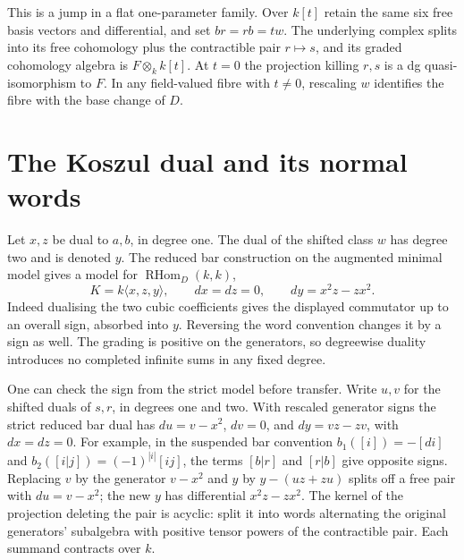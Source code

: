 \documentclass[11pt]{article}
\newcommand{\RHom}{\operatorname{RHom}}
\begin{document}
This is a jump in a flat one-parameter family. Over $k[t]$ retain the
same six free basis vectors and differential, and set $br=rb=t w$.
The underlying complex splits into its free cohomology plus the
contractible pair $r\mapsto s$, and its graded cohomology algebra is
$F\otimes_k k[t]$. At $t=0$ the projection killing $r,s$ is a dg
quasi-isomorphism to $F$. In any field-valued fibre with $t\ne0$,
rescaling $w$ identifies the fibre with the base change of $D$.

\section{The Koszul dual and its normal words}
Let $x,z$ be dual to $a,b$, in degree one. The dual of the shifted
class $w$ has degree two and is denoted $y$. The reduced bar construction
on the augmented minimal model gives a model for $\RHom_D(k,k)$,
\[
 K=k\langle x,z,y\rangle,\qquad dx=dz=0,\qquad dy=x^2z-zx^2 .
\]
Indeed dualising the two cubic coefficients gives the displayed
commutator up to an overall sign, absorbed into $y$. Reversing the
word convention changes it by a sign as well. The grading is positive
on the generators, so degreewise duality introduces no completed
infinite sums in any fixed degree.

One can check the sign from the strict model before transfer. Write $u,v$
for the shifted duals of $s,r$, in degrees one and two. With rescaled
generator signs the strict reduced bar dual has
$du=v-x^2$, $dv=0$, and $dy=vz-zv$, with $dx=dz=0$. For example, in
the suspended bar convention $b_1([i])=-[di]$ and
$b_2([i|j])=(-1)^{|i|}[ij]$, the terms $[b|r]$ and $[r|b]$ give
opposite signs. Replacing $v$ by the generator $v-x^2$ and $y$ by
$y-(uz+zu)$ splits off a free pair with $du=v-x^2$; the new $y$ has
differential $x^2z-zx^2$. The kernel of the projection deleting the pair
is acyclic: split it into words alternating the original generators'
subalgebra with positive tensor powers of the contractible pair.
Each summand contracts over $k$.
\end{document}
